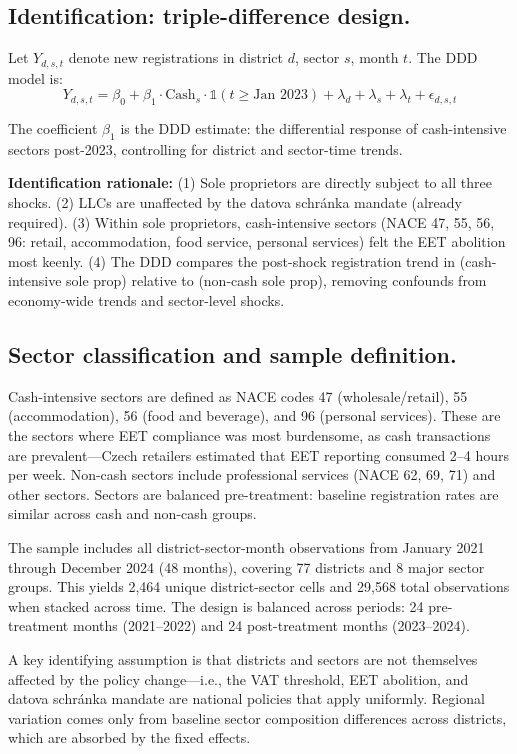 \documentclass[12pt]{article}
\begin{document}
\subsection*{Identification: triple-difference design.}
Let $Y_{d,s,t}$ denote new registrations in district $d$, sector $s$, month $t$. The DDD model is:
\begin{equation}
Y_{d,s,t} = \beta_0 + \beta_1 \cdot \text{Cash}_s \cdot \mathbb{1}(t \geq \text{Jan 2023}) + \lambda_d + \lambda_s + \lambda_t + \epsilon_{d,s,t}
\end{equation}

The coefficient $\beta_1$ is the DDD estimate: the differential response of cash-intensive sectors post-2023, controlling for district and sector-time trends.

\textbf{Identification rationale:}
(1) Sole proprietors are directly subject to all three shocks.
(2) LLCs are unaffected by the datova schr\'{a}nka mandate (already required).
(3) Within sole proprietors, cash-intensive sectors (NACE 47, 55, 56, 96: retail, accommodation, food service, personal services) felt the EET abolition most keenly.
(4) The DDD compares the post-shock registration trend in (cash-intensive sole prop) relative to (non-cash sole prop), removing confounds from economy-wide trends and sector-level shocks.

\subsection*{Sector classification and sample definition.}
Cash-intensive sectors are defined as NACE codes 47 (wholesale/retail), 55 (accommodation), 56 (food and beverage), and 96 (personal services). These are the sectors where EET compliance was most burdensome, as cash transactions are prevalent—Czech retailers estimated that EET reporting consumed 2--4 hours per week. Non-cash sectors include professional services (NACE 62, 69, 71) and other sectors. Sectors are balanced pre-treatment: baseline registration rates are similar across cash and non-cash groups.

The sample includes all district-sector-month observations from January 2021 through December 2024 (48 months), covering 77 districts and 8 major sector groups. This yields 2,464 unique district-sector cells and 29,568 total observations when stacked across time. The design is balanced across periods: 24 pre-treatment months (2021--2022) and 24 post-treatment months (2023--2024).

A key identifying assumption is that districts and sectors are not themselves affected by the policy change—i.e., the VAT threshold, EET abolition, and datova schr\'{a}nka mandate are national policies that apply uniformly. Regional variation comes only from baseline sector composition differences across districts, which are absorbed by the fixed effects.
\end{document}
